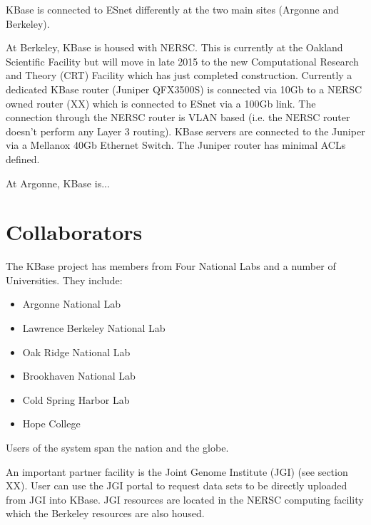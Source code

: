 \documentclass[10pt,a4paper]{report}
\begin{document}
KBase is connected to ESnet differently at the two main sites (Argonne and Berkeley).

At Berkeley, KBase is housed with NERSC.  This is currently at the Oakland Scientific Facility but will move in late 2015 to the new Computational Research and Theory (CRT) Facility which has just completed construction.  Currently a dedicated KBase router (Juniper QFX3500S) is connected via 10Gb to a NERSC owned router (XX) which is connected to ESnet via a 100Gb link.  The connection through the NERSC router is VLAN based (i.e. the NERSC router doesn't perform any Layer 3 routing).  KBase servers are connected to the Juniper via a Mellanox 40Gb Ethernet Switch.  The Juniper router has minimal ACLs defined.  

At Argonne, KBase is...




\section{Collaborators}

The KBase project has members from Four National Labs and a number of Universities.   They include:
\begin{itemize}
\item Argonne National Lab
\item Lawrence Berkeley National Lab
\item Oak Ridge National Lab
\item Brookhaven National Lab
\item Cold Spring Harbor Lab
\item Hope College
\end{itemize}

Users of the system span the nation and the globe.  

An important partner facility is the Joint Genome Institute (JGI) (see section XX).  User can use the JGI portal to request data sets to be directly uploaded from JGI into KBase.  JGI resources are located in the NERSC computing facility which the Berkeley resources are also housed.
\end{document}

